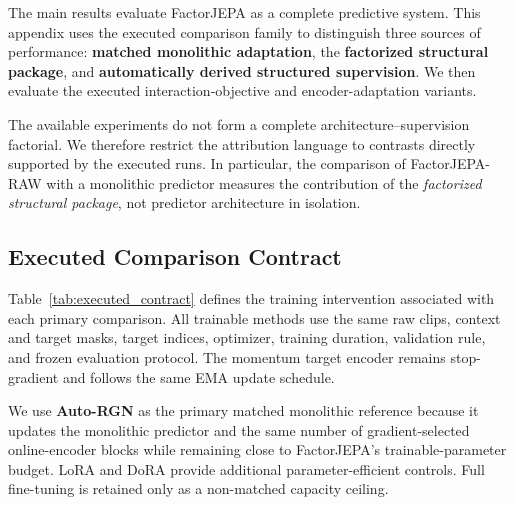 The main results evaluate FactorJEPA as a complete predictive system.
This appendix uses the executed comparison family to distinguish three
sources of performance: \textbf{matched monolithic adaptation}, the
\textbf{factorized structural package}, and
\textbf{automatically derived structured supervision}. We then evaluate the
executed interaction-objective and encoder-adaptation variants.

The available experiments do not form a complete
architecture--supervision factorial. We therefore restrict the
attribution language to contrasts directly supported by the executed
runs. In particular, the comparison of FactorJEPA-RAW with a monolithic
predictor measures the contribution of the
\emph{factorized structural package}, not predictor architecture in
isolation.


\subsection{Executed Comparison Contract}
\label{app:attribution_contract}

Table~\ref{tab:executed_contract} defines the training intervention
associated with each primary comparison. All trainable methods use the
same raw clips, context and target masks, target indices, optimizer,
training duration, validation rule, and frozen evaluation protocol.
The momentum target encoder remains stop-gradient and follows the same
EMA update schedule.

We use \textbf{Auto-RGN} as the primary matched monolithic reference
because it updates the monolithic predictor and the same number of
gradient-selected online-encoder blocks while remaining close to
FactorJEPA's trainable-parameter budget. LoRA and DoRA provide
additional parameter-efficient controls. Full fine-tuning is retained
only as a non-matched capacity ceiling.

